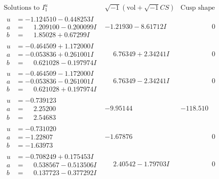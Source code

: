 \documentclass[1p]{elsarticle_modified}
\theoremstyle{definition}
\newcommand{\I}{\sqrt{-1}}
\begin{document}
$$\begin{array}{c|c|c}
\text{Solutions to }I^u_{1}& \I (\text{vol} + \sqrt{-1}CS) & \text{Cusp shape}\\
 \hline 
\begin{aligned}
u &= -1.124510 - 0.448253 I \\
a &= \phantom{-}1.209100 - 0.200099 I \\
b &= \phantom{-}1.85028 + 0.67299 I\end{aligned}
 & -1.21930 - 8.61712 I & \phantom{-0.000000 } 0 \\ \hline\begin{aligned}
u &= -0.464509 + 1.172000 I \\
a &= -0.053836 + 0.261001 I \\
b &= \phantom{-}0.621028 - 0.197974 I\end{aligned}
 & \phantom{-}6.76349 + 2.34241 I & \phantom{-0.000000 } 0 \\ \hline\begin{aligned}
u &= -0.464509 - 1.172000 I \\
a &= -0.053836 - 0.261001 I \\
b &= \phantom{-}0.621028 + 0.197974 I\end{aligned}
 & \phantom{-}6.76349 - 2.34241 I & \phantom{-0.000000 } 0 \\ \hline\begin{aligned}
u &= -0.739123\phantom{ +0.000000I} \\
a &= \phantom{-}2.25200\phantom{ +0.000000I} \\
b &= \phantom{-}2.54683\phantom{ +0.000000I}\end{aligned}
 & -9.95144\phantom{ +0.000000I} & -118.510\phantom{ +0.000000I} \\ \hline\begin{aligned}
u &= -0.731020\phantom{ +0.000000I} \\
a &= -1.22807\phantom{ +0.000000I} \\
b &= -1.63973\phantom{ +0.000000I}\end{aligned}
 & -1.67876\phantom{ +0.000000I} & \phantom{-0.000000 } 0 \\ \hline\begin{aligned}
u &= -0.708249 + 0.175453 I \\
a &= \phantom{-}0.538567 - 0.513506 I \\
b &= \phantom{-}0.137723 - 0.377292 I\end{aligned}
 & \phantom{-}2.40542 - 1.79703 I & \phantom{-0.000000 } 0 \\ \hline\begin{aligned}

\end{aligned}
\end{array}$$
\end{document}
